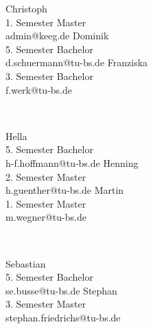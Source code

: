 {Christoph\\ 1. Semester Master\\ admin@keeg.de}
\hfill
{}
{Dominik\\5. Semester Bachelor\\ d.schuermann@tu-bs.de}
\hfill
{}
{Franziska\\3. Semester Bachelor\\ f.werk@tu-bs.de}
\par \ \par
{}
{Hella\\ 5. Semester Bachelor\\ h-f.hoffmann@tu-bs.de}
\hfill
{}
{Henning\\ 2. Semester Master\\ h.guenther@tu-bs.de}
\hfill
{}
{Martin\\ 1. Semester Master\\ m.wegner@tu-bs.de}
\par \ \par
{}
{Sebastian\\ 5. Semester Bachelor\\ se.busse@tu-bs.de}
\hfill
{}
{Stephan\\ 3. Semester Master\\ stephan.friedrichs@tu-bs.de}


\twocolumn
